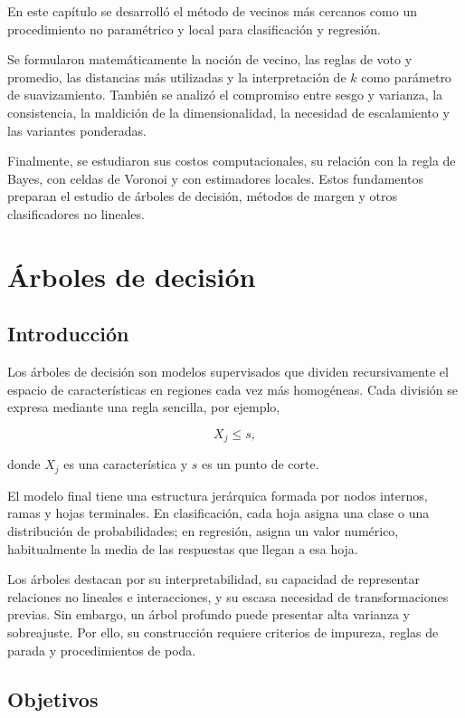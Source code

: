 \documentclass[
  spanish,
  11pt,
  letterpaper,
  DIV=11,
  numbers=noendperiod]{scrreprt}
\theoremstyle{definition}
\theoremstyle{plain}
\theoremstyle{definition}
\theoremstyle{remark}
\begin{document}
En este capítulo se desarrolló el método de vecinos más cercanos como un
procedimiento no paramétrico y local para clasificación y regresión.

Se formularon matemáticamente la noción de vecino, las reglas de voto y
promedio, las distancias más utilizadas y la interpretación de \(k\)
como parámetro de suavizamiento. También se analizó el compromiso entre
sesgo y varianza, la consistencia, la maldición de la dimensionalidad,
la necesidad de escalamiento y las variantes ponderadas.

Finalmente, se estudiaron sus costos computacionales, su relación con la
regla de Bayes, con celdas de Voronoi y con estimadores locales. Estos
fundamentos preparan el estudio de árboles de decisión, métodos de
margen y otros clasificadores no lineales.

\chapter{Árboles de decisión}\label{sec-arboles-decision}

\section{Introducción}\label{introducciuxf3n-13}

Los árboles de decisión son modelos supervisados que dividen
recursivamente el espacio de características en regiones cada vez más
homogéneas. Cada división se expresa mediante una regla sencilla, por
ejemplo,

\[
X_j \leq s,
\]

donde \(X_j\) es una característica y \(s\) es un punto de corte.

El modelo final tiene una estructura jerárquica formada por nodos
internos, ramas y hojas terminales. En clasificación, cada hoja asigna
una clase o una distribución de probabilidades; en regresión, asigna un
valor numérico, habitualmente la media de las respuestas que llegan a
esa hoja.

Los árboles destacan por su interpretabilidad, su capacidad de
representar relaciones no lineales e interacciones, y su escasa
necesidad de transformaciones previas. Sin embargo, un árbol profundo
puede presentar alta varianza y sobreajuste. Por ello, su construcción
requiere criterios de impureza, reglas de parada y procedimientos de
poda.

\section{Objetivos}\label{objetivos-12}
\end{document}
